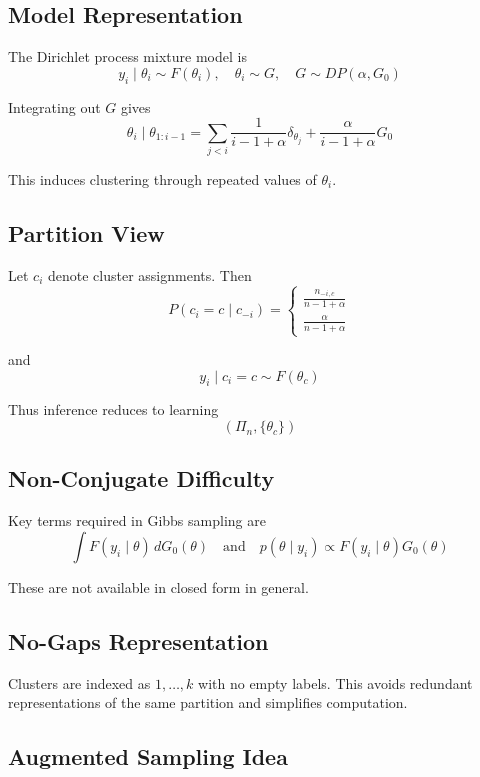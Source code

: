 \documentclass[12pt,oneside]{book}
\numberwithin{equation}{section}
\theoremstyle{definition}
\theoremstyle{plain}
\theoremstyle{remark}
\begin{document}
\subsection*{Model Representation}

The Dirichlet process mixture model is
\[
y_i \mid \theta_i \sim F(\theta_i), \quad \theta_i \sim G, \quad G \sim DP(\alpha, G_0)
\]

Integrating out $G$ gives
\[
\theta_i \mid \theta_{1:i-1}
=
\sum_{j<i} \frac{1}{i-1+\alpha}\delta_{\theta_j}
+
\frac{\alpha}{i-1+\alpha} G_0
\]

This induces clustering through repeated values of $\theta_i$.

\subsection*{Partition View}

Let $c_i$ denote cluster assignments. Then
\[
P(c_i = c \mid c_{-i})
=
\begin{cases}
\frac{n_{-i,c}}{n-1+\alpha} \\
\frac{\alpha}{n-1+\alpha}
\end{cases}
\]

and
\[
y_i \mid c_i = c \sim F(\theta_c)
\]

Thus inference reduces to learning
\[
(\Pi_n, \{\theta_c\})
\]

\subsection*{Non-Conjugate Difficulty}

Key terms required in Gibbs sampling are
\[
\int F(y_i \mid \theta)\, dG_0(\theta)
\quad \text{and} \quad
p(\theta \mid y_i) \propto F(y_i \mid \theta)G_0(\theta)
\]

These are not available in closed form in general.

\subsection*{No-Gaps Representation}

Clusters are indexed as $1,\dots,k$ with no empty labels. This avoids redundant representations of the same partition and simplifies computation.

\subsection*{Augmented Sampling Idea}
\end{document}
